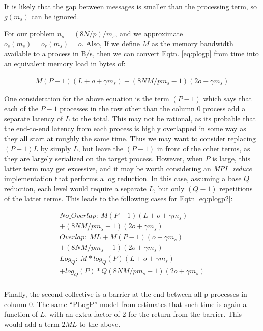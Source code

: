 It is likely that the gap between messages is smaller than the processing term, so $g(m_s)$ can be ignored.

For our problem $n_s=(8N/p)/m_s$, and we approximate $o_s(m_s)=o_r(m_s)=o$. Also, If we define $M$ as the memory bandwidth available to a process in B/s, then we can convert Eqtn. \ref{eq:plogp} from time into an equivalent memory load in bytes of:

\begin{eqnarray}\label{eq:plogp2}
M(P-1)(L+o+\gamma m_s) 
+(8NM/pm_s-1)(2o+\gamma m_s)
\end{eqnarray}

One consideration for the above equation is the term $(P-1)$ which says that each of the $P-1$ processes in the row other than the column 0 process add a separate latency of $L$ to the total. This may not be rational, as its probable that the end-to-end latency from each process is highly overlapped in some way as they all start at roughly the same time. Thus we may want to consider replacing $(P-1)L$ by simply $L$, but leave the $(P-1)$ in front of the other terms, as they are largely serialized on the target process. However, when $P$ is large, this latter term may get excessive, and it may be worth considering an \emph{MPI\_reduce} implementation that performs a log reduction. In this case, assuming a base $Q$ reduction, each level would require a separate $L$, but only $(Q-1)$ repetitions of the latter terms. This leads to the following cases for Eqtn \ref{eq:plogp2}:

\begin{eqnarray}\label{eq:plogp3}
No\_Overlap:~M(P-1)(L+o+\gamma m_s)\\+(8NM/pm_s-1)(2o+\gamma m_s)\\
Overlap:~ML+M(P-1)(o+\gamma m_s)\\+(8NM/pm_s-1)(2o+\gamma m_s) \\
Log_Q:~M*log_Q(P)(L+o+\gamma m_s)\\+log_Q(P)*Q(8NM/pm_s-1)(2o+\gamma m_s)\\
\end{eqnarray}


Finally, the second collective is a barrier at the end between all p processes in column 0. The same ``PLogP'' model from \cite{techbib:Pjesivac-Grbovic:2007:PAM:1265235.1265248} estimates that such time is again a function of $L$, with an extra factor of 2 for the return from the barrier. This would add a term $2ML$ to the above.



